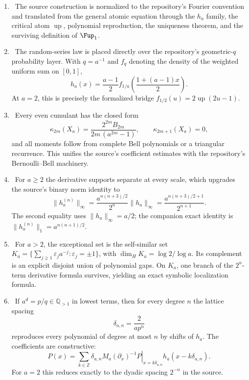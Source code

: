 \documentclass[11pt,oneside]{article}
\numberwithin{equation}{section}
\theoremstyle{definition}
\theoremstyle{remark}
\newcommand{\Q}{\mathbb Q}
\newcommand{\Z}{\mathbb Z}
\newcommand{\Up}{\operatorname{up}}
\begin{document}
\begin{enumerate}
\item \sourceflag\ The source construction is normalized to the repository's
Fourier convention and translated from the general atomic equation through the
$h_a$ family, the critical atom $\Up$, polynomial reproduction, the uniqueness
theorem, and the surviving definition of $\Fup_1$.

\item \repoflag\ The random-series law is placed directly over the repository's
geometric-$q$ probability layer.  With $q=a^{-1}$ and $f_q$ denoting the density
of the weighted uniform sum on $[0,1]$,
\[
 h_a(x)=\frac{a-1}{2}
 f_{1/a}\!\left(\frac{1+(a-1)x}{2}\right).
\]
At $a=2$, this is precisely the formalized bridge
$f_{1/2}(u)=2\Up(2u-1)$.

\item \newflag\ Every even cumulant has the closed form
\[
 \kappa_{2m}(X_a)=
 \frac{2^{2m}B_{2m}}{2m\,(a^{2m}-1)},
 \qquad \kappa_{2m+1}(X_a)=0,
\]
and all moments follow from complete Bell polynomials or a triangular recurrence.
This unifies the source's coefficient estimates with the repository's
Bernoulli--Bell machinery.

\item \newflag\ For $a\ge2$ the derivative supports separate at every scale,
which upgrades the source's binary norm identity to
\[
 \|h_a^{(n)}\|_\infty
 =\frac{a^{n(n+3)/2}}{2^n}\|h_a\|_\infty
 =\frac{a^{n(n+3)/2+1}}{2^{n+1}}.
\]
The second equality uses $\|h_a\|_\infty=a/2$; the companion exact identity is
   $\|h_a^{(n)}\|_1=a^{n(n+1)/2}$.

\item \newflag\ For $a>2$, the exceptional set is the self-similar set
$K_a=\{\sum_{j\ge1}\varepsilon_j a^{-j}:\varepsilon_j=\pm1\}$, with
$\dim_H K_a=\log 2/\log a$.  Its complement is an explicit disjoint union of
polynomial gaps.  On $K_a$, one branch of the $2^n$-term derivative formula
survives, yielding an exact symbolic localization formula.

\item \newflag\ If $a^d=p/q\in\Q_{>1}$ in lowest terms, then for every degree
$n$ the lattice spacing
\[
 \delta_{a,n}=\frac{2}{a p^n}
\]
reproduces every polynomial of degree at most $n$ by shifts of $h_a$.  The
coefficients are constructive:
\[
 P(x)=\sum_{k\in\Z}
 \left.\delta_{a,n}M_a(\partial_x)^{-1}P\right|_{x=k\delta_{a,n}}
 h_a(x-k\delta_{a,n}).
\]
For $a=2$ this reduces exactly to the dyadic spacing $2^{-n}$ in the source.


\end{enumerate}
\end{document}
